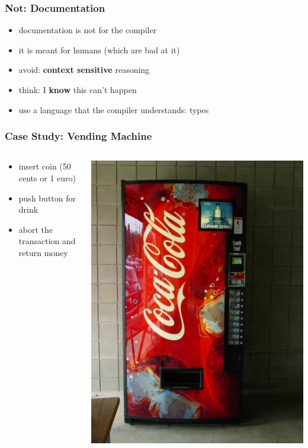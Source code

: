 \documentclass{beamer}
\begin{document}
\begin{frame}
  \frametitle{Not: Documentation}
  \begin{itemize}
  \item documentation is not for the compiler
  \item it is meant for humans (which are bad at it)
  \item avoid: \textbf{context sensitive} reasoning
  \item think: I \textbf{know} this can't happen
  \item use a language that the compiler understands: types
  \end{itemize}
\end{frame}

\begin{frame}
  \frametitle{Case Study: Vending Machine}
  \begin{columns}
    \begin{column}{0.6\textwidth}
      \begin{itemize}
      \item insert coin (50 cents or 1 euro)
      \item push button for drink
      \item abort the transaction and return money
      \end{itemize}
    \end{column}
    \begin{column}{0.4\textwidth}
      \begin{center}
        \includegraphics[width=\textwidth]{../pics/vending.jpg}
      \end{center}


\end{column}
\end{columns}
\end{frame}
\end{document}

